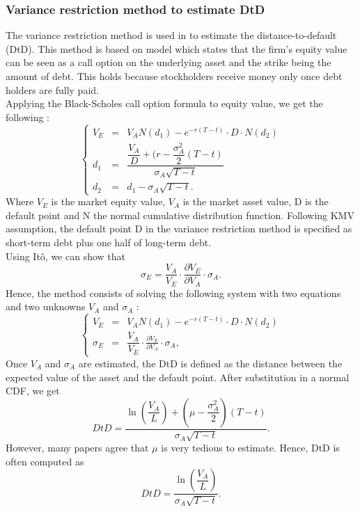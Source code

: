 \subsubsection{Variance restriction method to estimate DtD}
The variance restriction method is used in \citet{DSW} to estimate the distance-to-default (DtD). This method is based on \citet{Merton1974} model which states that the firm's equity value can be seen as a call option on the underlying asset and the strike being the amount of debt. This holds because stockholders receive money only once debt holders are fully paid. \\
Applying the Black-Scholes call option formula to equity value, we get the following :
\begin{equation*}
\left\{
  \begin{array}{lll}
    V_E & = & V_A N(d_1) - e^{-r(T-t)} \cdot D \cdot N(d_2)\\
    d_1 & = & \dfrac{\dfrac{V_A}{D}+(r-\dfrac{\sigma_A^2}{2}(T-t)}{\sigma_A \sqrt{T-t}} \\
    d_2 & = & d_1 - \sigma_A \sqrt{T-t}.
  \end{array}
\right.
\end{equation*}
Where $V_E$ is the market equity value, $V_A$ is the market asset value, D is the default point and N the normal cumulative distribution function. Following KMV assumption, the default point D in the variance restriction method is specified as short-term debt plus one half of long-term debt.\\
Using It\^o, we can show that 
\begin{equation*}
\sigma_E = \dfrac{V_A}{V_E}\cdot \frac{\partial V_E}{\partial V_A}\cdot \sigma_A.
\end{equation*}
Hence, the method consists of solving the following system with two equations and two unknowns $V_A$ and $\sigma_A$ :
\begin{equation*}
\left\{
  \begin{array}{lll}
    V_E & = & V_A N(d_1) - e^{-r(T-t)} \cdot D \cdot N(d_2)\\
    \sigma_E & = & \dfrac{V_A}{V_E}\cdot \frac{\partial V_E}{\partial V_A}\cdot \sigma_A,
  \end{array}
\right.
\end{equation*}
Once $V_A$ and $\sigma_A$ are estimated, the DtD is defined as the distance between the expected value of the asset and the default point. After substitution in a normal CDF, we get
\begin{equation}
DtD = \dfrac{\ln(\dfrac{V_A}{L})+(\mu-\dfrac{\sigma_A^2}{2})(T-t)}{\sigma_A \sqrt{T-t}}.
\end{equation}
However, many papers agree that $\mu$ is very tedious to estimate. Hence, DtD is often computed as
\begin{equation}
DtD = \dfrac{\ln(\dfrac{V_A}{L})}{\sigma_A \sqrt{T-t}}.
\end{equation}

